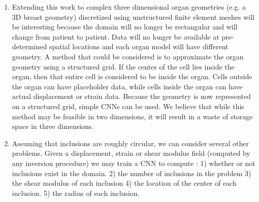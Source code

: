 \documentclass[12pt]{article}
\begin{document}
\begin{enumerate}
\item{Extending this work to complex three dimensional organ geometries (e.g. a 3D breast geometry) discretized using unstructured finite element meshes will be interesting because the domain will no longer be rectangular and will change from patient to patient. Data will no longer be available at pre-determined spatial locations and each organ model will have different geometry.  A method that could be considered is to approximate the organ geometry using a structured grid. If the center of the cell lies inside the organ, then that entire cell is considered to be inside the organ. Cells outside the organ can have placeholder data, while cells inside the organ can have actual displacement or strain data. Because the geometry is now represented on a structured grid, simple CNNs can be used. We believe that while this method may be feasible in two dimensions, it will result in a waste of storage space in three dimensions.}
\item{Assuming that inclusions are roughly circular, we can consider several other problems. Given a displacement, strain or shear modulus field (computed by any inversion procedure) we may train a CNN to compute : 1) whether or not inclusions exist in the domain. 2) the number of inclusions in the problem 3) the shear modulus of each inclusion 4) the location of the center of each inclusion. 5) the radius of each inclusion.}

\end{enumerate}
\end{document}
